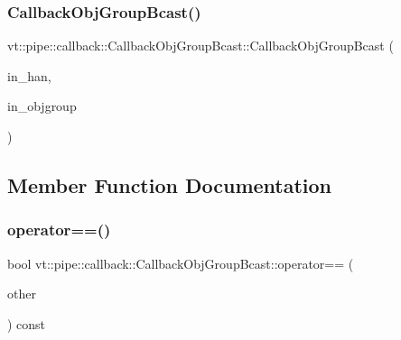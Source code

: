 \subsubsection{\texorpdfstring{Callback\+Obj\+Group\+Bcast()}{CallbackObjGroupBcast()}\hspace{0.1cm}{\footnotesize\ttfamily [2/2]}}
{\footnotesize\ttfamily vt\+::pipe\+::callback\+::\+Callback\+Obj\+Group\+Bcast\+::\+Callback\+Obj\+Group\+Bcast (\begin{DoxyParamCaption}\item[{\hyperlink{namespacevt_af64846b57dfcaf104da3ef6967917573}{Handler\+Type} const}]{in\+\_\+han,  }\item[{\hyperlink{namespacevt_ad7cae989df485fccca57f0792a880a8e}{Obj\+Group\+Proxy\+Type} const \&}]{in\+\_\+objgroup }\end{DoxyParamCaption})\hspace{0.3cm}{\ttfamily [inline]}}



\subsection{Member Function Documentation}
\mbox{\label{structvt_1_1pipe_1_1callback_1_1_callback_obj_group_bcast_a45c2e760843a416992e2a85c265136c7}} 
\subsubsection{\texorpdfstring{operator==()}{operator==()}}
{\footnotesize\ttfamily bool vt\+::pipe\+::callback\+::\+Callback\+Obj\+Group\+Bcast\+::operator== (\begin{DoxyParamCaption}\item[{\hyperlink{structvt_1_1pipe_1_1callback_1_1_callback_obj_group_bcast}{Callback\+Obj\+Group\+Bcast} const \&}]{other }\end{DoxyParamCaption}) const\hspace{0.3cm}{\ttfamily [inline]}}

\mbox{\label{structvt_1_1pipe_1_1callback_1_1_callback_obj_group_bcast_aa54227732bb00239a126c34c78aba5fb}} 
